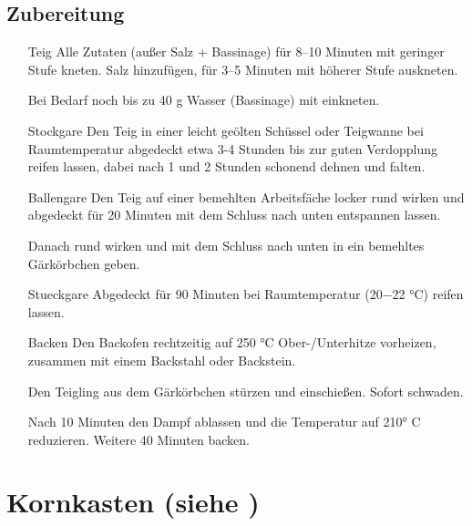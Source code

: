 \subsection*{Zubereitung}
\begin{enumerate}
    \item [Teig] 
        Alle Zutaten (außer Salz + Bassinage) für 8–10 Minuten mit geringer Stufe kneten. Salz hinzufügen, für 3–5 Minuten mit höherer Stufe auskneten. 
        
        Bei Bedarf noch bis zu 40 g Wasser (Bassinage) mit einkneten.
        \item [\Gls{Stockgare}]
        Den Teig in einer leicht geölten Schüssel oder Teigwanne bei Raumtemperatur abgedeckt etwa 3-4 Stunden bis zur guten Verdopplung reifen lassen, dabei nach 1 und 2 Stunden schonend dehnen und falten.
        \item [\Gls{Ballengare}]
        Den Teig auf einer bemehlten Arbeitsfäche locker rund wirken und abgedeckt für 20 Minuten mit dem Schluss nach unten entspannen lassen. 
        
        Danach rund wirken und mit dem Schluss nach unten in ein bemehltes Gärkörbchen geben.
        \item [\Gls{Stueckgare}]
        Abgedeckt für 90 Minuten bei Raumtemperatur (20−22 °C) reifen lassen.
        \item [Backen]
        Den Backofen rechtzeitig auf 250 °C Ober-/Unterhitze  vorheizen, zusammen mit einem Backstahl oder Backstein.
        
        Den Teigling aus dem Gärkörbchen stürzen und einschießen. Sofort schwaden. 
        
        Nach 10 Minuten den Dampf ablassen und die Temperatur auf 210° C reduzieren. Weitere 40 Minuten backen.
    \end{enumerate}


\section[Kornkasten]{Kornkasten \textmd{(siehe \cite[182]{SonjaBauer2021})}}   


